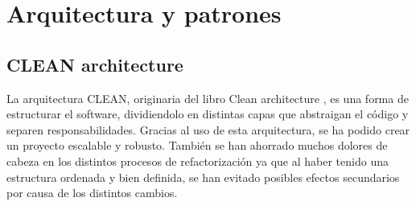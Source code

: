 \section{Arquitectura y patrones}
\subsection{CLEAN architecture}
\label{subsec:cleanArch}
La arquitectura CLEAN, originaria del libro Clean architecture \citep{CleanArchitecture}, es una forma de estructurar el software, dividiendolo en distintas capas que abstraigan el código y separen responsabilidades. Gracias al uso de esta arquitectura, se ha podido crear un proyecto escalable y robusto. También se han ahorrado muchos dolores de cabeza en los distintos procesos de refactorización ya que al haber tenido una estructura ordenada y bien definida, se han evitado posibles efectos secundarios por causa de los distintos cambios.

